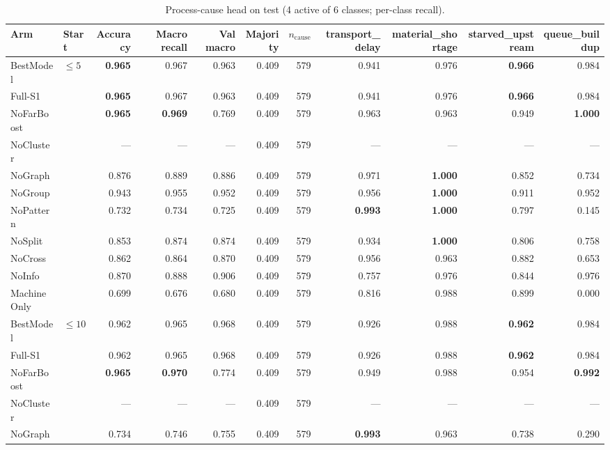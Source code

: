 \documentclass[9pt,a4paper,twocolumn]{extarticle}
\begin{document}
\begin{table}[tp]
\centering\scriptsize\setlength{\tabcolsep}{3.2pt}
\caption{Process-cause head on test (4 active of 6 classes; per-class recall).}
\begin{tabular}{llrrrrrrrrr}
\toprule
Arm & Start & Accuracy & \textbf{Macro recall} & Val macro & Majority & $n_{\mathrm{cause}}$ & transport\_delay & material\_shortage & starved\_upstream & queue\_buildup \\
\midrule
BestModel & $\le 5$ & \textbf{0.965} & 0.967 & 0.963 & 0.409 & 579 & 0.941 & 0.976 & \textbf{0.966} & 0.984 \\
Full-S1 &  & \textbf{0.965} & 0.967 & 0.963 & 0.409 & 579 & 0.941 & 0.976 & \textbf{0.966} & 0.984 \\
NoFarBoost &  & \textbf{0.965} & \textbf{0.969} & 0.769 & 0.409 & 579 & 0.963 & 0.963 & 0.949 & \textbf{1.000} \\
NoCluster &  & --- & --- & --- & 0.409 & 579 & --- & --- & --- & --- \\
NoGraph &  & 0.876 & 0.889 & 0.886 & 0.409 & 579 & 0.971 & \textbf{1.000} & 0.852 & 0.734 \\
NoGroup &  & 0.943 & 0.955 & 0.952 & 0.409 & 579 & 0.956 & \textbf{1.000} & 0.911 & 0.952 \\
NoPattern &  & 0.732 & 0.734 & 0.725 & 0.409 & 579 & \textbf{0.993} & \textbf{1.000} & 0.797 & 0.145 \\
NoSplit &  & 0.853 & 0.874 & 0.874 & 0.409 & 579 & 0.934 & \textbf{1.000} & 0.806 & 0.758 \\
NoCross &  & 0.862 & 0.864 & 0.870 & 0.409 & 579 & 0.956 & 0.963 & 0.882 & 0.653 \\
NoInfo &  & 0.870 & 0.888 & 0.906 & 0.409 & 579 & 0.757 & 0.976 & 0.844 & 0.976 \\
MachineOnly &  & 0.699 & 0.676 & 0.680 & 0.409 & 579 & 0.816 & 0.988 & 0.899 & 0.000 \\
\midrule
BestModel & $\le 10$ & 0.962 & 0.965 & 0.968 & 0.409 & 579 & 0.926 & 0.988 & \textbf{0.962} & 0.984 \\
Full-S1 &  & 0.962 & 0.965 & 0.968 & 0.409 & 579 & 0.926 & 0.988 & \textbf{0.962} & 0.984 \\
NoFarBoost &  & \textbf{0.965} & \textbf{0.970} & 0.774 & 0.409 & 579 & 0.949 & 0.988 & 0.954 & \textbf{0.992} \\
NoCluster &  & --- & --- & --- & 0.409 & 579 & --- & --- & --- & --- \\
NoGraph &  & 0.734 & 0.746 & 0.755 & 0.409 & 579 & \textbf{0.993} & 0.963 & 0.738 & 0.290 \\

\end{tabular}
\end{table}
\end{document}
